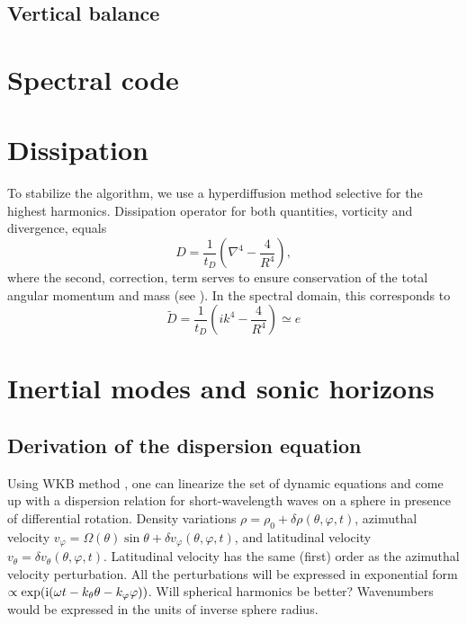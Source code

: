 \documentclass[usenatbib,onecolumn]{mnras}
\newcommand{\alert}[1]{\color{red} #1\color{black}}
\renewcommand{\i}{\ensuremath{{\rm i}}}
\begin{document}
\subsection{Vertical balance}

\section{Spectral code}

\section{Dissipation}

To stabilize the algorithm, we use a hyperdiffusion method selective for the
highest harmonics. Dissipation operator for both quantities, vorticity and
divergence, equals
\begin{equation}
\displaystyle  D = \frac{1}{t_{D}}\left(\nabla^4 - \frac{4}{R^4}\right),
\end{equation}
where the second, correction, term serves to ensure conservation of the total
angular momentum and mass (see \citet{swater}). In the spectral domain, this
corresponds to
\begin{equation}
\displaystyle   \tilde{D} = \frac{1}{t_{D}}\left( ik^4 -
\frac{4}{R^4}\right)\simeq e^{}
\end{equation}

\section{Inertial modes and sonic horizons}

\subsection{Derivation of the dispersion equation}

Using WKB method \citep{WKB}, one can linearize the set of dynamic equations
and come up with a dispersion relation for short-wavelength waves on a sphere
in presence of differential rotation. Density variations $\rho = \rho_0
+\delta \rho(\theta,\varphi, t)$, azimuthal velocity $v_\varphi = \Omega(\theta) \sin\theta +
\delta v_\varphi(\theta,\varphi, t)$, and latitudinal velocity $v_\theta = \delta
v_\theta(\theta,\varphi, t)$. Latitudinal velocity has the same (first) order
as the azimuthal velocity perturbation. All the perturbations will be
expressed in exponential form $\propto \exp(\i(\omega t - k_\theta \theta
- k_\varphi \varphi))$. \alert{Will spherical harmonics be better?}
Wavenumbers would be expressed in the units of inverse sphere radius. 
\end{document}
